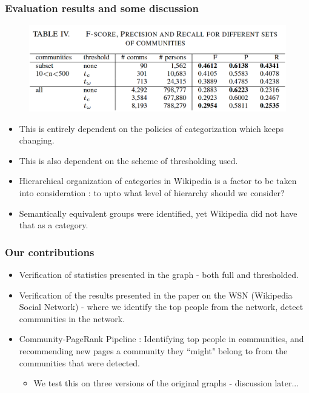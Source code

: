 \documentclass[9pt, compress]{beamer}
\begin{document}
\begin{frame}[fragile]
	\frametitle{Evaluation results and some discussion}
\vspace{-10mm}
\begin{figure}
	\centering
    \includegraphics[width=0.75\linewidth]{img/table-eval.png}
\end{figure}
\begin{itemize}
\item This is entirely dependent on the policies of categorization which keeps changing.
\item This is also dependent on the scheme of thresholding used.
\item Hierarchical organization of categories in Wikipedia is a factor to be taken into consideration : to upto what level of hierarchy should we consider?
\item Semantically equivalent groups were identified, yet Wikipedia did not have that as a category.
\end{itemize}
\end{frame}

\begin{frame}[fragile]
	\frametitle{Our contributions}
\vspace{-10mm}
\begin{itemize}
\item Verification of statistics presented in the graph - both full and thresholded.
\item Verification of the results presented in the paper on the WSN (Wikipedia Social Network) - where we identify the top people from the network, detect communities in the network.
\item Community-PageRank Pipeline : Identifying top people in communities, and recommending new pages a community they ``might" belong to from the communities that were detected.
\begin{itemize}
\item We test this on three versions of the original graphs - discussion later...
\end{itemize}
\end{itemize}
\end{frame}
\end{document}
